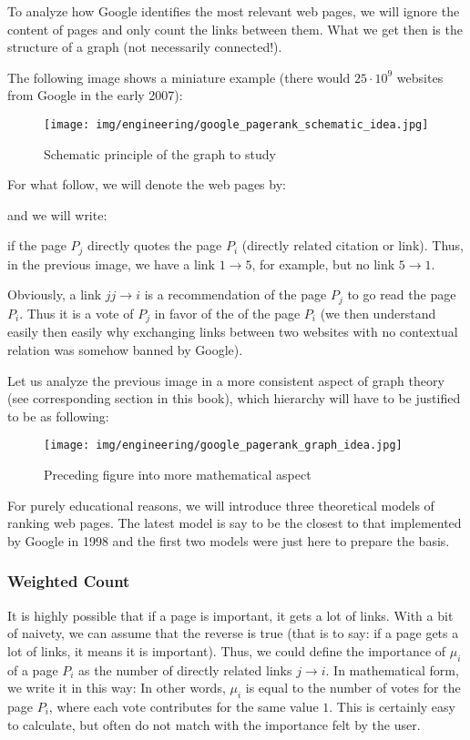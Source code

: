 	To analyze how Google identifies the most relevant web pages, we will ignore the content of pages and only count the links between them. What we get then is the structure of a graph (not necessarily connected!).
	
	The following image shows a miniature example (there would $25\cdot 10^9$ websites from Google in the early 2007):
	\begin{figure}[H]
		\centering
		\texttt{[image: img/engineering/google\_pagerank\_schematic\_idea.jpg]}
		\caption{Schematic principle of the graph to study}
	\end{figure}
	For what follow, we will denote the web pages by:
	
	and we will write:
	
	if the page $P_j$ directly quotes the page $P_i$ (directly related citation or link). Thus, in the previous image, we have a link $1\longrightarrow 5$, for example, but no link $5\longrightarrow 1$.
	
	Obviously, a link $jj\longrightarrow i$ is a recommendation of the page $P_j$ to go read the page $P_i$. Thus it is a vote of $P_j$ in favor of the of the page $P_i$ (we then understand easily then easily why exchanging links between two websites with no contextual relation was somehow banned by Google).
	
	Let us analyze the previous image in a more consistent aspect of graph theory (see corresponding section in this book), which hierarchy will have to be justified to be as following:
	\begin{figure}[H]
		\centering
		\texttt{[image: img/engineering/google\_pagerank\_graph\_idea.jpg]}
		\caption[]{Preceding figure into more mathematical aspect}
	\end{figure}
	For purely educational reasons, we will introduce three theoretical models of ranking web pages. The latest model is say to be the closest to that implemented by Google in 1998 and the first two models were just here to prepare the basis.
	
	\subsubsection{Weighted Count}
	It is highly possible that if a page is important, it gets a lot of links. With a bit of naivety, we can assume that the reverse is true (that is to say: if a page gets a lot of links, it means it is important). Thus, we could define the importance of $\mu_i$ of a page $P_i$ as the number of directly related links $j\rightarrow i$. In mathematical form, we write it in this way:
	In other words, $\mu_i$ is equal to the number of votes for the page $P_i$, where each vote contributes for the same value $1$. This is certainly easy to calculate, but often do not match with the importance felt by the user.

